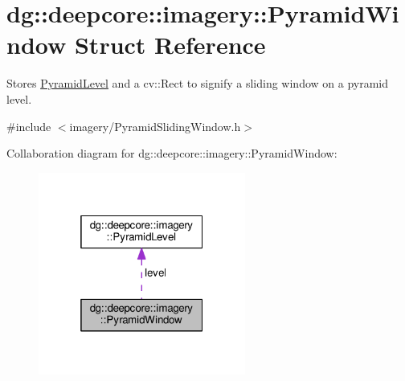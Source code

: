 \hypertarget{structdg_1_1deepcore_1_1imagery_1_1_pyramid_window}{}\section{dg\+:\+:deepcore\+:\+:imagery\+:\+:Pyramid\+Window Struct Reference}
\label{structdg_1_1deepcore_1_1imagery_1_1_pyramid_window}


Stores \hyperlink{structdg_1_1deepcore_1_1imagery_1_1_pyramid_level}{Pyramid\+Level} and a cv\+::\+Rect to signify a sliding window on a pyramid level.  




{\ttfamily \#include $<$imagery/\+Pyramid\+Sliding\+Window.\+h$>$}



Collaboration diagram for dg\+:\+:deepcore\+:\+:imagery\+:\+:Pyramid\+Window\+:
\nopagebreak
\begin{figure}[H]
\begin{center}
\leavevmode
\includegraphics[width=193pt]{structdg_1_1deepcore_1_1imagery_1_1_pyramid_window__coll__graph}
\end{center}
\end{figure}
